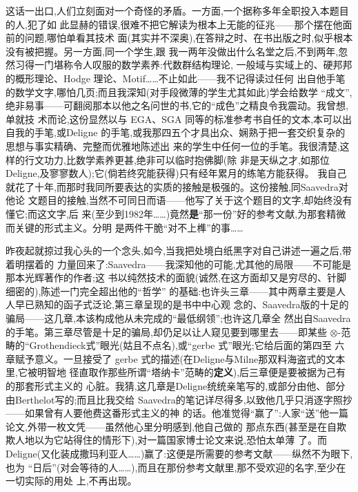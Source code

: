 这话一出口,人们立刻面对一个奇怪的矛盾。一方面,一个据称多年全职投入本题目的人,犯了如
此显赫的错误,很难不把它解读为根本上无能的征兆——那个摆在他面前的问题,哪怕单看其技术
面(其实并不深奥),在答辩之时、在书出版之时,似乎根本没有被把握。另一方面,同一个学生,跟
我一两年没做出什么名堂之后,不到两年,忽然习得一门堪称令人叹服的数学素养:代数群结构理论,
一般域与\dmark{}实域上的、硬邦邦的概形理论、Hodge 理论、Motif……不止如此——我不记得读过任何
出自他手笔的数学文字,哪怕几页;而且我深知(对手段微薄的学生尤其如此)学会给数学
“成文”,绝非易事——可翻阅那本以他之名问世的书,它的“成色”之精良令我震动。我曾想,单就技
术而论,这份显然以与 EGA、SGA 同等的标准参考书自任的文本,本可以出自我的手笔,或Deligne
的手笔,或我那四五个才具出众、娴熟于把一套交织复杂的思想与事实精确、完整而优雅地陈述出
来的学生中任何一位的手笔。我很清楚,这样的行文功力,比数学素养更甚,绝非可以临时抱佛脚(除
非是天纵之才,如那位Deligne,及寥寥数人);它(倘若终究能获得)只有经年累月的练笔方能获得。
我自己就花了十年,而那时我同所要表达的实质的接触是极强的。这份接触,同Saavedra对他论
文题目的接触,当然不可同日而语——他写了关于这个题目的文字,却始终没有懂它;而这文字,后
来(至少到1982年……)竟然\textbf{是}“那一份”好的参考文献,为那套精微而关键的形式主义。分明
是两件干脆“对不上榫”的事……

昨夜起就掠过我心头的一个念头,如今,当我把处境白纸黑字对自己讲述一遍之后,带着明摆着的
力量回来了:Saavedra——我深知他的可能,尤其他的局限——不可能是那本光辉著作的作者;这
书以纯然技术的面貌(诚然,在这方面却又是穷尽的、针脚细密的),陈述一门完全超出他的“哲学”
的基础:也许头三章——其中两章主要是人人早已熟知的函子式泛论,第三章呈现的是书中中心观
念的、Saavedra版的十足的骗局——这几章,本该构成他从未完成的“最低纲领”;也许这几章全
然出自Saavedra的手笔。第三章尽管是十足的骗局,却仍足以\dmark{}让人窥见要到哪里去——即某些 $\otimes$-范畴的“Grothendieck式”眼光(姑且不点名),或“gerbe 式”眼光;它给后面的第四至
六章赋予意义。一旦接受了 gerbe 式的描述(在Deligne与Milne那双料海盗式的文本里,它被明智地
径直取作那些所谓“塔纳卡”范畴的\textbf{定义}),后三章便是要被据为己有的那套形式主义的
心脏。我猜,这几章是Deligne统统亲笔写的,或部分由他、部分由Berthelot写的;而且比我交给
Saavedra的笔记详尽得多,以致他几乎只消逐字照抄——如果曾有人要他费这番形式主义的神
的话。他准觉得“赢了”:人家“送”他一篇论文,外带一枚文凭——虽然他心里分明感到,他自己做的
那点东西(甚至是在自欺欺人地以为它站得住的情形下),对一篇国家博士论文来说,恐怕太单薄
了。而Deligne(又化装成撒玛利亚人……)赢了:这便是所需要的参考文献——纵然不为眼下,也为
“日后”(对会等待的人……),而且在那份参考文献里,那不受欢迎的名字,至少在一切实际的用处
上,不再出现。

